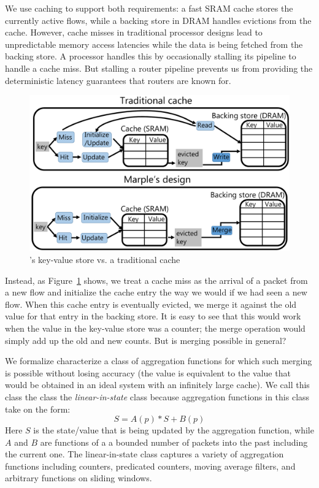 We use caching to support both requirements: a fast SRAM cache stores the
currently active flows, while a backing store in DRAM handles evictions from
the cache. However, cache misses in traditional processor designs lead to
unpredictable memory access latencies while the data is being fetched from the
backing store. A processor handles this by occasionally stalling its pipeline
to handle a cache miss. But stalling a router pipeline prevents us from
providing the deterministic latency guarantees that routers are known for.

\begin{figure}
\centering
\includegraphics[width=0.6\columnwidth]{pq_kv_store.pdf}
\caption{\TheSystem's key-value store vs. a traditional cache}
\label{fig:hw_diff}
\end{figure}

Instead, as Figure~\ref{fig:hw_diff} shows, we treat a cache miss as the
arrival of a packet from a new flow and initialize the cache entry the way we
would if we had seen a new flow. When this cache entry is eventually evicted,
we merge it against the old value for that entry in the backing store. It is
easy to see that this would work when the value in the key-value store was a
counter; the merge operation would simply add up the old and new counts. But is
merging possible in general?

We formalize characterize a class of aggregation functions for which such
merging is possible without losing accuracy (\ie the value is equivalent to the
value that would be obtained in an ideal system with an infinitely large
cache). We call this class the class the {\em linear-in-state} class because
aggregation functions in this class take on the form:
\begin{equation}
S = A(p) * S + B(p)
\end{equation}
Here $S$ is the state/value that is being updated by the aggregation function,
while $A$ and $B$ are functions of a a bounded number of packets into the past
including the current one. The linear-in-state class captures a variety of
aggregation functions including counters, predicated counters, moving average
filters, and arbitrary functions on sliding windows.


